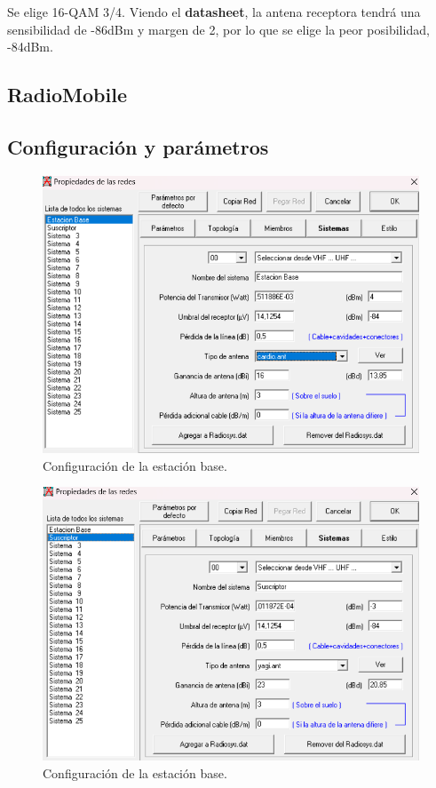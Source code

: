 \documentclass{article}
\begin{document}
Se elige 16-QAM 3/4. Viendo el \textbf{datasheet}, la antena receptora tendrá una sensibilidad de -86dBm y margen de 2, por lo que se elige la peor posibilidad, -84dBm.

\subsection{RadioMobile}

\subsection{Configuración y parámetros}

\begin{figure}[ht]
    \centering
    \includegraphics[width=0.75\linewidth]{src/estacionbase.png}
    \caption{\label{fig:ebaseconfig} Configuración de la estación base.}
\end{figure}

\begin{figure}[ht]
    \centering
    \includegraphics[width=0.75\linewidth]{src/suscriptor.png}
    \caption{\label{fig:suscripconfig} Configuración de la estación base.}
\end{figure}
\end{document}
